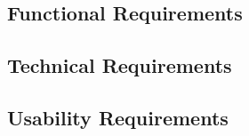 \subsection{Functional Requirements} %
\label{sub:functional_requirement}

\subsection{Technical Requirements} %
\label{sub:technical_requirements}

\subsection{Usability Requirements} %
\label{sub:usability_requirements}

